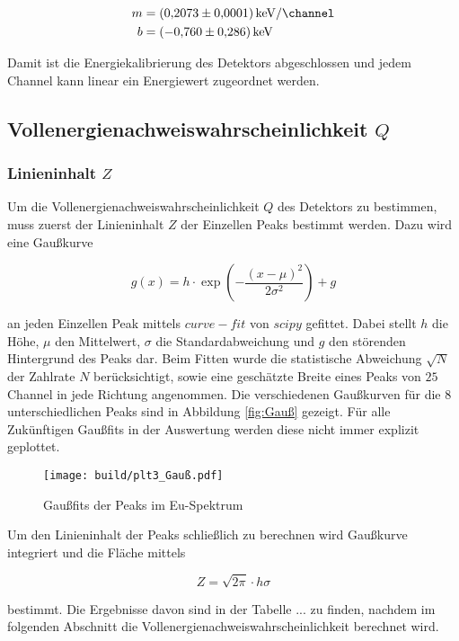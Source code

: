 \begin{align*}
	m & =\qty[per-mode=fraction]{0.2073(0.0001)}{\kilo\eV\per\channel} \\
	b & =\qty{-0.760(0.286)}{\kilo\eV}
\end{align*}

Damit ist die Energiekalibrierung des Detektors abgeschlossen und jedem Channel
kann linear ein Energiewert zugeordnet werden.

\subsection{Vollenergienachweiswahrscheinlichkeit $Q$}
\subsubsection{Linieninhalt $Z$}
Um die Vollenergienachweiswahrscheinlichkeit $Q$ des Detektors zu bestimmen,
muss zuerst der Linieninhalt $Z$ der Einzellen Peaks bestimmt werden. Dazu wird
eine Gaußkurve

\begin{equation}
	g(x)=h\cdot \exp(-\frac{(x-\mu )^2}{2\sigma^2})+g
	\label{eq:Gauß}
\end{equation}

an jeden Einzellen Peak mittels $curve-fit$ von $scipy$ \cite{scipy} gefittet.
Dabei stellt $h$ die Höhe, $\mu$ den Mittelwert, $\sigma$ die
Standardabweichung und $g$ den störenden Hintergrund des Peaks dar. Beim Fitten
wurde die statistische Abweichung $\sqrt{N}$ der Zahlrate $N$ berücksichtigt,
sowie eine geschätzte Breite eines Peaks von $25$ Channel in jede Richtung
angenommen. Die verschiedenen Gaußkurven für die 8 unterschiedlichen Peaks sind
in Abbildung \eqref{fig:Gauß} gezeigt. Für alle Zukünftigen Gaußfits in der
Auswertung werden diese nicht immer explizit geplottet.

\begin{figure}
	\centering
	\texttt{[image: build/plt3\_Gauß.pdf]}
	\caption{Gaußfits der Peaks im Eu-Spektrum}
	\label{fig:Gauß}
\end{figure}

Um den Linieninhalt der Peaks schließlich zu berechnen wird Gaußkurve
integriert und die Fläche mittels

\begin{equation}
	Z=\sqrt{2\pi}\cdot h\sigma
	\label{eq:Z}
\end{equation}

bestimmt. Die Ergebnisse davon sind in der Tabelle ... zu finden, nachdem im
folgenden Abschnitt die Vollenergienachweiswahrscheinlichkeit berechnet wird.

